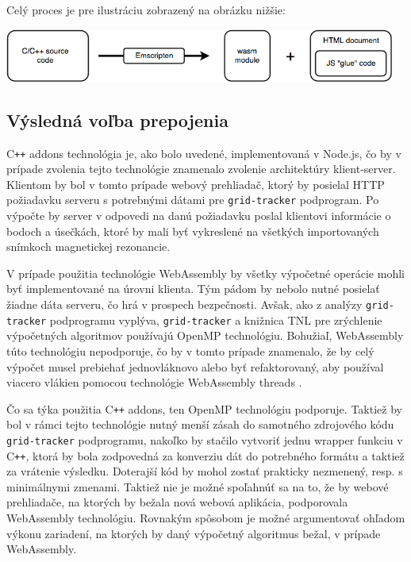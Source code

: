 Celý proces je pre ilustráciu zobrazený na obrázku nižšie:
\begin {center}
        \centering
        \includegraphics[height=1.75cm]{media/graphs/cpp_to_wasm.png}
        \captionsetup{justification=centering}
\end {center}

\subsection {Výsledná voľba prepojenia}
C\texttt{++} addons technológia je, ako bolo uvedené, implementovaná v Node.js, čo by v prípade zvolenia tejto technológie znamenalo zvolenie architektúry klient-server. Klientom by bol v tomto prípade webový prehliadač, ktorý by posielal HTTP požiadavku serveru s potrebnými dátami pre \texttt{grid-tracker} podprogram. Po výpočte by server v odpovedi na danú požiadavku poslal klientovi informácie o bodoch a úsečkách, ktoré by mali byť vykreslené na všetkých importovaných snímkoch magnetickej rezonancie.

V prípade použitia technológie WebAssembly by všetky výpočetné operácie mohli byť implementované na úrovni klienta. Tým pádom by nebolo nutné posielať žiadne dáta serveru, čo hrá v prospech bezpečnosti. Avšak, ako z analýzy \texttt{grid-tracker} podprogramu vyplýva, \texttt{grid-tracker} a knižnica TNL pre zrýchlenie výpočetných algoritmov používajú OpenMP technológiu.
Bohužiaľ, WebAssembly túto technológiu nepodporuje, čo by v tomto prípade znamenalo, že by celý výpočet musel prebiehať jednovláknovo alebo byť refaktorovaný, aby používal viacero vlákien pomocou technológie WebAssembly threads \cite{webassembly_threads}.

Čo sa týka použitia C\texttt{++} addons, ten OpenMP technológiu podporuje. Taktiež by bol v rámci tejto technológie nutný menší zásah do samotného zdrojového kódu \texttt{grid-tracker} podprogramu, nakoľko by stačilo vytvoriť jednu wrapper funkciu v C\texttt{++}, ktorá by bola zodpovedná za konverziu dát do potrebného formátu a taktiež za vrátenie výsledku. Doterajší kód by mohol zostať prakticky nezmenený, resp. s minimálnymi zmenami.
Taktiež nie je možné spoľahnúť sa na to, že by webové prehliadače, na ktorých by bežala nová webová aplikácia, podporovala WebAssembly technológiu. Rovnakým spôsobom je možné argumentovať ohľadom výkonu zariadení, na ktorých by daný výpočetný algoritmus bežal, v prípade WebAssembly.

